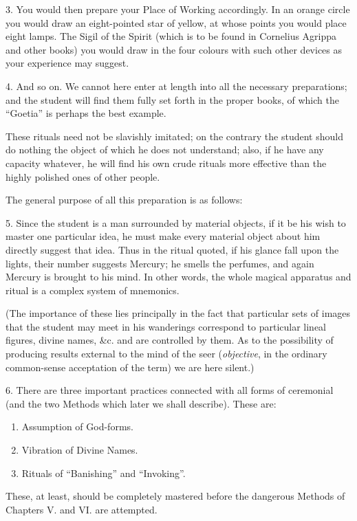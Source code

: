 3. You would then prepare your Place of Working accordingly. In an orange circle you would draw an eight-pointed star of yellow, at whose points you would place eight lamps. The Sigil of the Spirit (which is to be found in Cornelius Agrippa and other books) you would draw in the four colours with such other devices as your experience may suggest.

4. And so on. We cannot here enter at length into all the necessary preparations; and the student will find them fully set forth in the proper books, of which the \enquote{Goetia} is perhaps the best example.

These rituals need not be slavishly imitated; on the contrary the student should do nothing the object of which he does not understand; also, if he have any capacity whatever, he will find his own crude rituals more effective than the highly polished ones of other people.


The general purpose of all this preparation is as follows:


5. Since the student is a man surrounded by material objects, if it be his wish to master one particular idea, he must make every material object about him directly suggest that idea. Thus in the ritual quoted, if his glance fall upon the lights, their number suggests Mercury; he smells the perfumes, and again Mercury is brought to his mind. In other words, the whole magical apparatus and ritual is a complex system of mnemonics.

(The importance of these lies principally in the fact that particular sets of images that the student may meet in his wanderings correspond to particular lineal figures, divine names, \&c. and are controlled by them. As to the possibility of producing results external to the mind of the seer (\textit{objective}, in the ordinary common-sense acceptation of the term) we are here silent.)

6. There are three important practices connected with all forms of ceremonial (and the two Methods which later we shall describe). These are:

\begin{enumerate}[label=(\arabic*)]
\item Assumption of God-forms.
\item Vibration of Divine Names.
\item Rituals of \enquote{Banishing} and \enquote{Invoking}.
\end{enumerate}

These, at least, should be completely mastered before the dangerous Methods of Chapters V. and VI. are attempted.



